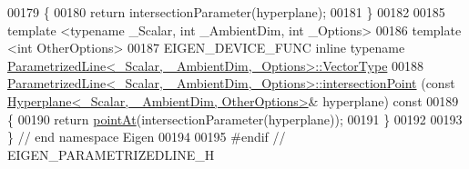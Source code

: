 \begin{DoxyCode}
00179 \textcolor{keyword}{}\{
00180   \textcolor{keywordflow}{return} intersectionParameter(hyperplane);
00181 \}
00182 
00185 \textcolor{keyword}{template} <\textcolor{keyword}{typename} \_Scalar, \textcolor{keywordtype}{int} \_AmbientDim, \textcolor{keywordtype}{int} \_Options>
00186 \textcolor{keyword}{template} <\textcolor{keywordtype}{int} OtherOptions>
00187 EIGEN\_DEVICE\_FUNC \textcolor{keyword}{inline} \textcolor{keyword}{typename} 
      \hyperlink{group___core___module}{ParametrizedLine<\_Scalar, \_AmbientDim,\_Options>::VectorType}
00188 \hyperlink{group___geometry___module_a9319102677fc48d2208c949f448f4829}{ParametrizedLine<\_Scalar, \_AmbientDim,\_Options>::intersectionPoint}
      (\textcolor{keyword}{const} \hyperlink{group___geometry___module_class_eigen_1_1_hyperplane}{Hyperplane<\_Scalar, \_AmbientDim, OtherOptions>}& 
      hyperplane)\textcolor{keyword}{ const}
00189 \textcolor{keyword}{}\{
00190   \textcolor{keywordflow}{return} \hyperlink{group___geometry___module_ae0a510cc78156974ab5a7fb8a6b2326a}{pointAt}(intersectionParameter(hyperplane));
00191 \}
00192 
00193 \} \textcolor{comment}{// end namespace Eigen}
00194 
00195 \textcolor{preprocessor}{#endif // EIGEN\_PARAMETRIZEDLINE\_H}
\end{DoxyCode}
